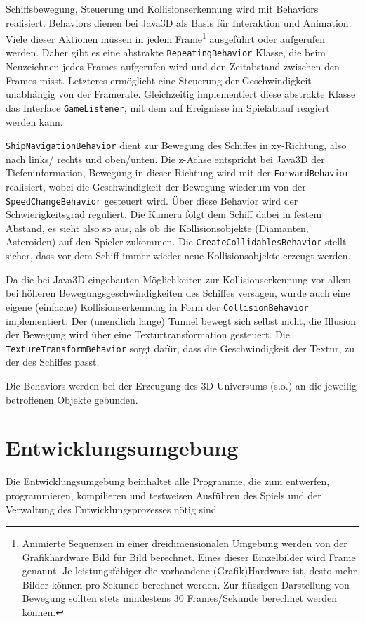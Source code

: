 \documentclass[a4paper,12pt]{scrartcl}
\begin{document}
Schiffsbewegung, Steuerung und Kollisionserkennung wird mit Behaviors realisiert.
Behaviors dienen bei Java3D als Basis für Interaktion und Animation. Viele dieser Aktionen
müssen in jedem Frame\footnote{Animierte Sequenzen in einer dreidimensionalen Umgebung werden von der Grafikhardware Bild für Bild berechnet. Eines dieser Einzelbilder wird Frame genannt. Je leistungsfähiger die vorhandene (Grafik)Hardware ist, desto mehr Bilder können pro Sekunde berechnet werden. Zur flüssigen Darstellung von Bewegung sollten stets mindestens 30 Frames/Sekunde berechnet werden können.} ausgeführt oder aufgerufen werden. Daher gibt es eine abstrakte \texttt{RepeatingBehavior} Klasse, die beim Neuzeichnen jedes Frames aufgerufen wird und den Zeitabstand zwischen den Frames misst. Letzteres ermöglicht eine Steuerung der Geschwindigkeit unabhängig von der Framerate. Gleichzeitig implementiert diese abstrakte Klasse das Interface \texttt{GameListener}, mit dem auf Ereignisse im
Spielablauf reagiert werden kann.

\texttt{ShipNavigationBehavior} dient zur Bewegung des Schiffes in xy-Richtung,
also nach links/ rechts und oben/unten. Die z-Achse entspricht bei Java3D der Tiefeninformation, Bewegung
in dieser Richtung wird mit der \texttt{ForwardBehavior} realisiert, wobei die
Geschwindigkeit der Bewegung wiederum von der \texttt{SpeedChangeBehavior}
gesteuert wird. Über diese Behavior wird der Schwierigkeitsgrad reguliert. Die
Kamera folgt dem Schiff dabei in festem Abstand, es sieht also so aus, als ob die Kollisionsobjekte (Diamanten, Asteroiden) auf den Spieler zukommen. Die
\texttt{CreateCollidablesBehavior} stellt sicher, dass vor dem Schiff immer wieder neue Kollisionsobjekte erzeugt werden.

Da die bei Java3D eingebauten Möglichkeiten zur Kollisionserkennung vor allem bei
höheren Bewegungsgeschwindigkeiten des Schiffes versagen, wurde auch eine eigene
(einfache) Kollisionserkennung in Form der \texttt{CollisionBehavior}
implementiert. Der (unendlich lange) Tunnel bewegt sich selbst nicht, die Illusion der Bewegung wird über eine
Texturtransformation gesteuert. Die \texttt{TextureTransformBehavior} sorgt
dafür, dass die Geschwindigkeit der Textur, zu der des Schiffes passt.

Die Behaviors werden bei der Erzeugung des 3D-Universums (s.o.) an die jeweilig
betroffenen Objekte gebunden.

\section{Entwicklungsumgebung}
Die Entwicklungsumgebung beinhaltet alle Programme, die zum entwerfen,
programmieren, kompilieren und testweisen Ausführen des Spiels und der Verwaltung des
Entwicklungsprozesses nötig sind.
\end{document}
